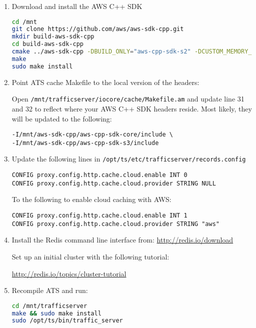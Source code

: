 \begin{enumerate}

\item
Download and install the AWS C++ SDK

\begin{lstlisting}[language=bash]
cd /mnt
git clone https://github.com/aws/aws-sdk-cpp.git
mkdir build-aws-sdk-cpp
cd build-aws-sdk-cpp
cmake ../aws-sdk-cpp -DBUILD_ONLY="aws-cpp-sdk-s2" -DCUSTOM_MEMORY_MANAGEMENT=0
make
sudo make install
\end{lstlisting}

\item
Point ATS cache Makefile to the local version of the headers:

Open \verb|/mnt/trafficserver/iocore/cache/Makefile.am| and update line 31 and 32 to reflect where your AWS C++ SDK headers reside. Most likely, they will be updated to the following:

\begin{verbatim}
-I/mnt/aws-sdk-cpp/aws-cpp-sdk-core/include \
-I/mnt/aws-sdk-cpp/aws-cpp-sdk-s3/include
\end{verbatim}

\item
Update the following lines in \verb|/opt/ts/etc/trafficserver/records.config|

\begin{verbatim}
CONFIG proxy.config.http.cache.cloud.enable INT 0
CONFIG proxy.config.http.cache.cloud.provider STRING NULL
\end{verbatim}

To the following to enable cloud caching with AWS:

\begin{verbatim}
CONFIG proxy.config.http.cache.cloud.enable INT 1
CONFIG proxy.config.http.cache.cloud.provider STRING "aws" 
\end{verbatim}

\item
Install the Redis command line interface from: \url{http://redis.io/download}

Set up an initial cluster with the following tutorial:

 \url{http://redis.io/topics/cluster-tutorial}

\item
Recompile ATS and run:

\begin{lstlisting}[language=bash]
cd /mnt/trafficserver
make && sudo make install
sudo /opt/ts/bin/traffic_server
\end{lstlisting}

\end{enumerate}

